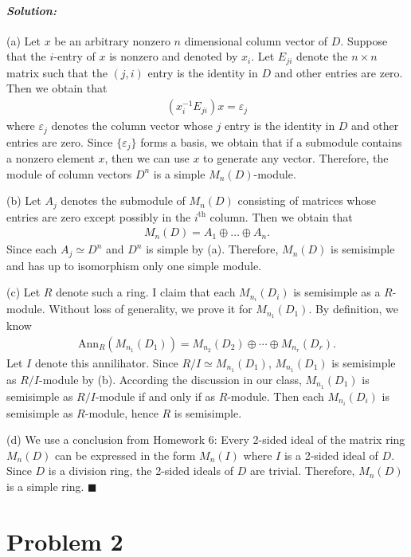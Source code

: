 \documentclass[12pt, a4paper]{article}
\theoremstyle{remark}
\newenvironment{solution}
  {\paragraph{\textit{Solution:}}\par\medskip}
  {\hfill$\blacksquare$\vspace{0.1cm}}
\begin{document}
\begin{solution}
(a) Let $x$ be an arbitrary nonzero $n$ dimensional column vector of $D$. Suppose that the $i$-entry of $x$ is nonzero and denoted by $x_i$. 
Let $E_{ji}$ denote the $n\times n$ matrix such that the $(j,i)$ entry is the identity in $D$ and other entries are zero.
Then we obtain that 
\begin{align*}
    (x_i^{-1}E_{ji})x = \varepsilon_j
\end{align*}
where $\varepsilon_j$ denotes the column vector whose $j$ entry is the identity in $D$ and other entries are zero.
Since $\{\varepsilon_j\}$ forms a basis, we obtain that if a submodule contains a nonzero element $x$, then we can use $x$ to generate any vector. Therefore, the module of column vectors $D^n$ is a simple $M_n(D)$-module.

(b) Let $A_j$ denotes the submodule of $M_n(D)$ consisting of matrices whose entries are zero except possibly in the $i^{\text{th}}$ column. Then we obtain that 
\begin{align*}
    M_n(D) = A_1\oplus \dots\oplus A_n.
\end{align*} 
Since each $A_j\simeq D^n$ and $D^n$ is simple by (a). Therefore, $M_n(D)$ is semisimple and has up to isomorphism only one simple module.

(c) Let $R$ denote such a ring. I claim that each $M_{n_i}(D_i)$ is semisimple as a $R$-module.
Without loss of generality, we prove it for $M_{n_1}(D_1)$. By definition, we know 
\begin{align*}
    \text{Ann}_R(M_{n_1}(D_1)) = M_{n_2}(D_2) \oplus \cdots \oplus M_{n_r}(D_r).
\end{align*}
Let $I$ denote this annilihator. Since $R/I\simeq M_{n_1}(D_1)$, $M_{n_1}(D_1)$ is semisimple as $R/I$-module by (b).
According the discussion in our class, $M_{n_1}(D_1)$ is semisimple as $R/I$-module if and only if as $R$-module.
Then each $M_{n_i}(D_i)$ is semisimple as $R$-module, hence $R$ is semisimple.

(d) We use a conclusion from Homework 6: Every 2-sided ideal of the matrix ring $M_n(D)$ can be expressed in the form $M_n(I)$ where $I$ is a 2-sided ideal of $D$.
Since $D$ is a division ring, the 2-sided ideals of $D$ are trivial. Therefore, $M_n(D)$ is a simple ring.
\end{solution}




\section*{Problem 2}
\end{document}

